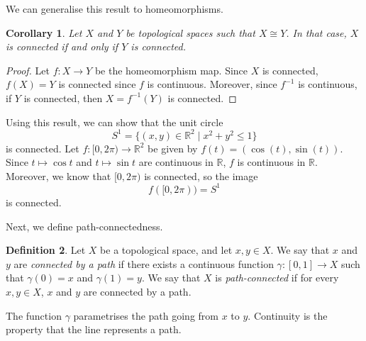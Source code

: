 \documentclass[a4paper, openany]{memoir}
\theoremstyle{definition}
\newtheorem{definition}{Definition}[section]
\theoremstyle{plain}
\newtheorem{corollary}[definition]{Corollary}
\begin{document}
\noindent We can generalise this result to homeomorphisms.
\begin{corollary}
Let $X$ and $Y$ be topological spaces such that $X \cong Y$. In that case, $X$ is connected if and only if $Y$ is connected.
\end{corollary}
\begin{proof}
Let $f: X \to Y$ be the homeomorphism map. Since $X$ is connected, $f(X) = Y$ is connected since $f$ is continuous. Moreover, since $f^{-1}$ is continuous, if $Y$ is connected, then $X = f^{-1}(Y)$ is connected.
\end{proof}
Using this result, we can show that the unit circle
\[S^1 = \{(x, y) \in \mathbb{R}^2 \mid x^2 + y^2 \leqslant 1\}\]
is connected. Let $f: [0, 2\pi) \to \mathbb{R}^2$ be given by $f(t) = (\cos (t), \sin (t))$. Since $t \mapsto \cos t$ and $t \mapsto \sin t$ are continuous in $\mathbb{R}$, $f$ is continuous in $\mathbb{R}$. Moreover, we know that $[0, 2\pi)$ is connected, so the image
\[f([0, 2\pi)) = S^1\]
is connected.

Next, we define path-connectedness.
\begin{definition}
Let $X$ be a topological space, and let $x, y \in X$. We say that $x$ and $y$ are \emph{connected by a path} if there exists a continuous function $\gamma: [0, 1] \to X$ such that $\gamma(0) = x$ and $\gamma(1) = y$. We say that $X$ is \emph{path-connected} if for every $x, y \in X$, $x$ and $y$ are connected by a path.
\end{definition}
\noindent The function $\gamma$ parametrises the path going from $x$ to $y$. Continuity is the property that the line represents a path.
\end{document}
